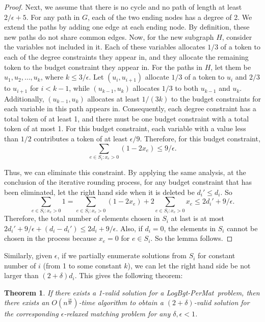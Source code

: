\documentclass[11pt,a4paper]{article} \usepackage{enumitem}
\newcommand{\LBOmatch}{\textsf{LogBgt-PerMat}}
\newtheorem{theorem}{Theorem}[section]
\theoremstyle{definition}
\begin{document}
\begin{proof}
Next, we assume that there is no cycle and no path of length at least $2/\epsilon + 5$. For any path in $G$, each of the two ending nodes has a degree of 2. We extend the paths by adding one edge at each ending node. By definition, these new paths do not share common edges. Now, for the new subgraph $H$, consider the variables not included in it. Each of these variables allocates $1/3$ of a token to each of the degree constraints they appear in, and they allocate the remaining token to the budget constraint they appear in. For the paths in $H$, let them be $u_1,u_2,\ldots ,u_k$, where $k \leq 3/\epsilon$. Let $(u_i,u_{i+1})$ allocate $1/3$ of a token to $u_i$ and $2/3$ to $u_{i+1}$ for $i < k-1$, while $(u_{k-1},u_k)$ allocates $1/3$ to both $u_{k-1}$ and $u_k$. Additionally, $(u_{k-1},u_k)$ allocates at least $1/(3k)$ to the budget constraints for each variable in this path appears in. Consequently, each degree constraint has a total token of at least 1, and there must be one budget constraint with a total token of at most 1. For this budget constraint, each variable with a value less than $1/2$ contributes a token of at least $\epsilon/9$. Therefore, for this budget constraint,
$$\sum_{e\in S_i:x_e>0}(1-2x_e)\leq 9/\epsilon.$$

Thus, we can eliminate this constraint. By applying the same analysis, at the conclusion of the iterative rounding process, for any budget constraint that has been eliminated, let the right hand side when it is deleted be $d_i'\leq d_i$. So
$$\sum_{e\in S_i:x_e>0}1=\sum_{e\in S_i:x_e>0}(1-2x_e)+2\sum_{e\in S_i:x_e>0}x_e\leq 2d_i'+9/\epsilon.$$
Therefore, the total number of elements chosen in $S_i$ at last is at most $2d_i'+9/\epsilon+(d_i-d_i')\leq 2d_i+9/\epsilon$. Also, if $d_i=0$, the elements in $S_i$ cannot be chosen in the process because $x_e=0$ for $e\in S_i$. So the lemma follows.
\end{proof}

Similarly, given $\epsilon$, if we partially enumerate solutions from $S_i$ for constant number of $i$ (from 1 to some constant $k$), we can let the right hand side be not larger than $(2+\delta)d_i$. This gives the following theorem:

\begin{theorem}
\label{thm:relaxed}
If there exists a 1-valid solution for a \LBOmatch\ problem, then there exists an $O(n^{\frac{18}{\delta\epsilon}})$-time algorithm to obtain a $(2+\delta)$-valid solution for the corresponding $\epsilon$-relaxed matching problem for any $\delta,\epsilon<1$.
\end{theorem}
\end{document}
